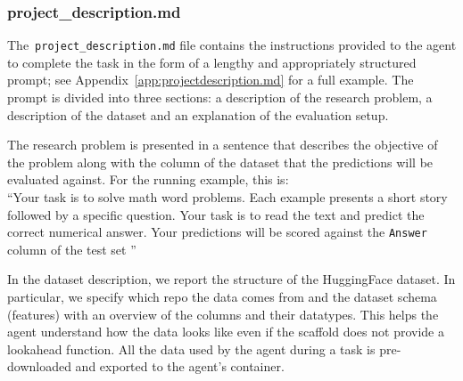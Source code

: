 \documentclass{fairmeta}
\newcommand{\airsbench}{\textsc{AIRS-Bench}}
\begin{document}


\subsubsection{project\_description.md}
\label{sec:projectdescription}
The~\texttt{project\_description.md} file contains the instructions provided to the agent to complete the task in the form of a lengthy and appropriately structured prompt; see Appendix~\ref{app:projectdescription.md} for a full example. The prompt is divided into three sections: a description of the research problem, a description of the dataset and an explanation of the evaluation setup.

The research problem is presented in a sentence that describes the objective of the problem along with the column of the dataset that the predictions will be evaluated against. For the running example, this is:\\
``Your task is to solve math word problems. Each example presents a short story followed by a specific question. Your task is to read the text and predict the correct numerical answer. Your predictions will be scored against the \texttt{Answer} column of the test set
''



In the dataset description, we report the structure of the HuggingFace dataset. In particular, we specify  which repo the data comes from and the dataset schema (features) with an overview of the columns and their datatypes. This helps the agent understand how the data looks like even if the scaffold does not provide a lookahead function. All the data used by the agent during a task is pre-downloaded and exported to the agent's container.
\end{document}
